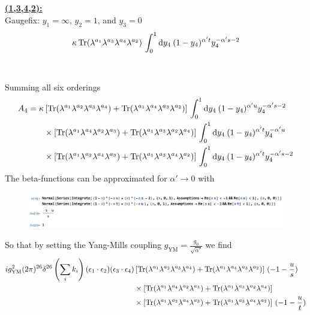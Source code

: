 \documentclass[a4paper,10pt]{article}
\renewcommand\[{\begin{equation*}}
\renewcommand\]{\end{equation*}}
\numberwithin{equation}{section}
\begin{document}
\\\\
\underline{\textbf{(1,3,4,2):}}\\
Gaugefix: $y_1=\infty,\,y_2=1$, and $y_3=0$
\begin{equation}
	\begin{aligned}
		\kappa \Tr(\lambda^{a_1}\lambda^{a_3}\lambda^{a_4}\lambda^{a_2})\,\int_{0}^{1} \dd y_4\:(1-y_4)^{\alpha' t}y_{4}^{-\alpha's-2}
	\end{aligned}
\end{equation}
\\\\
Summing all six orderings
\begin{equation}
\begin{aligned}
A_4=\kappa& \left[\Tr(\lambda^{a_1}\lambda^{a_2}\lambda^{a_3}\lambda^{a_4})+\Tr(\lambda^{a_1}\lambda^{a_4}\lambda^{a_3}\lambda^{a_2})\right]\,\int_{0}^{1} \dd y_4\:(1-y_4)^{\alpha' u}y_{4}^{-\alpha's-2}\\
&\times\left[\Tr(\lambda^{a_1}\lambda^{a_4}\lambda^{a_2}\lambda^{a_3})+\Tr(\lambda^{a_1}\lambda^{a_3}\lambda^{a_2}\lambda^{a_4})\right]\,\int_{0}^{1} \dd y_4\:(1-y_4)^{\alpha' t}y_{4}^{-\alpha'u}\\
&\times\left[\Tr(\lambda^{a_1}\lambda^{a_2}\lambda^{a_4}\lambda^{a_3})+\Tr(\lambda^{a_1}\lambda^{a_3}\lambda^{a_4}\lambda^{a_2})\right]\,\int_{0}^{1} \dd y_4\:(1-y_4)^{\alpha' t}y_{4}^{-\alpha's-2}
\end{aligned}
\end{equation}
The beta-functions can be approximated for $\alpha'\to 0$ with
\begin{figure}[H]
    \centering
    \includegraphics[width=18cm]{cal.png}
\end{figure}
So that by setting the Yang-Mills coupling $g_{\text{YM}}=\frac{g_0}{\sqrt{\alpha'}}$ we find
\begin{equation} \label{eq:STYM}
	\begin{aligned}
ig_{\text{YM}}^2(2\pi)^{26}\delta^{26}\left(\sum_ik_i\right)(\epsilon_{1}\cdot \epsilon_{2})(\epsilon_{3}\cdot \epsilon_{4})& \left[\Tr(\lambda^{a_1}\lambda^{a_2}\lambda^{a_3}\lambda^{a_4})+\Tr(\lambda^{a_1}\lambda^{a_4}\lambda^{a_3}\lambda^{a_2})\right]\,(-1-\frac{u}{s})\\
&\times\left[\Tr(\lambda^{a_1}\lambda^{a_4}\lambda^{a_2}\lambda^{a_3})+\Tr(\lambda^{a_1}\lambda^{a_3}\lambda^{a_2}\lambda^{a_4})\right]\\
&\times\left[\Tr(\lambda^{a_1}\lambda^{a_2}\lambda^{a_4}\lambda^{a_3})+\Tr(\lambda^{a_1}\lambda^{a_3}\lambda^{a_4}\lambda^{a_2})\right]\,(-1-\frac{u}{t})
\end{aligned}
\end{equation}
\end{document}

